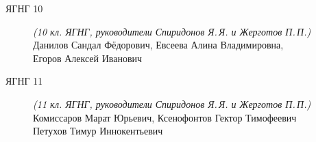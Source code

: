 \begin{description}
\item[ЯГНГ 10] \textit{(10 кл. ЯГНГ, руководители Спиридонов Я.\,Я. и Жерготов П.\,П.)} \\
Данилов Сандал Фёдорович, Евсеева Алина Владимировна, \\
Егоров Алексей Иванович

\item[ЯГНГ 11] \textit{(11 кл. ЯГНГ, руководители Спиридонов Я.\,Я. и Жерготов П.\,П.)} \\
Комиссаров Марат Юрьевич, Ксенофонтов Гектор Тимофеевич \\
Петухов Тимур Иннокентьевич

\end{description}
